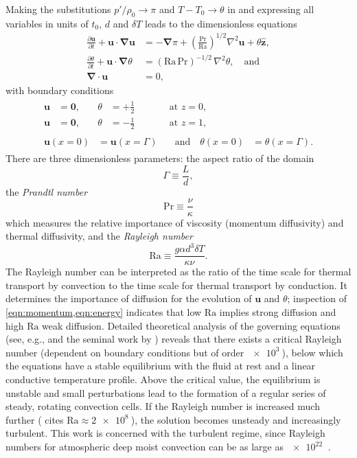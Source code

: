 \documentclass[titlepage,twoside]{article}
\numberwithin{equation}{section}
\newcommand{\pdiff}[2]{\frac{\partial #1}{\partial #2}}
\renewcommand\vec{\bm}
\newcommand{\uvec}[1]{\vec{\hat{#1}}}
\newcommand{\grad}{\vec{\nabla}}
\newcommand{\prandtl}{\ensuremath{\mathrm{Pr}}}
\newcommand{\rayleigh}{\ensuremath{\mathrm{Ra}}}
\begin{document}
Making the substitutions $p'/\rho_0 \to \pi$ and $T - T_0 \to \theta$
in  and expressing all
variables in units of $t_0$, $d$ and $\delta T$ leads to the dimensionless
equations
\begin{align}
    \label{eqn:momentum}
    \pdiff{\vec{u}}{t} + \vec{u} \cdot \grad \vec{u}
        &= -\grad \pi + \left( \frac{\prandtl}{\rayleigh}\right)^{1/2}
        \nabla^2 \vec{u} + \theta \uvec{z}, \\
    \label{eqn:energy}
    \pdiff{\theta}{t} + \vec{u} \cdot \grad \theta
        &= (\rayleigh\,\prandtl)^{-1/2} \, \nabla^2 \theta, \quad \text{and} \\
    \label{eqn:incompressible}
    \grad \cdot \vec{u} &= 0,
\end{align}
with boundary conditions
\begin{gather}
\begin{alignat}{3}
    \label{eqn:bc_bot}
    \vec{u} &= \vec{0}, &\quad \theta &= +\frac{1}{2}
    &\qquad& \text{at } z = 0, \\
    \label{eqn:bc_top}
    \vec{u} &= \vec{0}, &\quad \theta &= -\frac{1}{2}
    &\qquad& \text{at } z = 1,
\end{alignat} \\
\begin{alignat}{2}
    \label{eqn:bc_sides}
    \vec{u}(x=0) &= \vec{u}(x=\Gamma)
    &\quad \text{and} \quad \theta(x=0) &= \theta(x=\Gamma).
\end{alignat}
\end{gather}
There are three dimensionless parameters: the aspect ratio of the domain
\[
    \Gamma \equiv \frac{L}{d},
\]
the \emph{Prandtl number}
\[
    \prandtl \equiv \frac{\nu}{\kappa}
\]
which measures the relative importance of viscosity (momentum diffusivity)
and thermal diffusivity, and the \emph{Rayleigh number}
\[
    \rayleigh \equiv \frac{g \alpha d^3 \delta T}{\kappa \nu}.
\]
The Rayleigh number can be interpreted as the ratio of the time scale for
thermal transport by convection to the time scale for thermal transport by
conduction. It determines the importance of diffusion for the evolution of
$\vec{u}$ and $\theta$; inspection of \cref{eqn:momentum,eqn:energy} indicates
that low $\rayleigh$ implies strong diffusion and high $\rayleigh$ weak
diffusion. Detailed theoretical analysis of the governing equations (see, e.g.,
\textcite{chandrasekhar1961} and the seminal work by \textcite{rayleigh1916})
reveals that there exists a critical Rayleigh number (dependent on boundary
conditions but of order $\SI{e3}{}$), below which the equations have a stable
equilibrium with the fluid at rest and a linear conductive temperature profile.
Above the critical value, the equilibrium is unstable and small perturbations
lead to the formation of a regular series of steady, rotating convection cells.
If the Rayleigh number is increased much further (\textcite{le_quere1991} cites
$\rayleigh \approx \SI{2e8}{}$), the solution becomes unsteady and increasingly
turbulent. This work is concerned with the turbulent regime, since Rayleigh
numbers for atmospheric deep moist convection can be as large as $\SI{e22}{}$
\parencite{chilla2012}.
\end{document}
